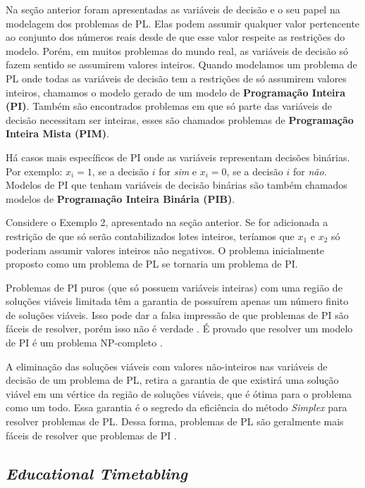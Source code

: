 Na seção anterior foram apresentadas as variáveis de decisão e o seu papel na modelagem dos problemas de PL. Elas podem assumir qualquer valor pertencente ao conjunto dos números reais desde de que esse valor respeite as restrições do modelo. Porém, em muitos problemas do mundo real, as variáveis de decisão só fazem sentido se assumirem valores inteiros. Quando modelamos um problema de PL onde todas as variáveis de decisão tem a restrições de só assumirem valores inteiros, chamamos o modelo gerado de um modelo de \textbf{Programação Inteira (PI)}. Também são encontrados problemas em que só parte das variáveis de decisão necessitam ser inteiras, esses são chamados problemas de \textbf{Programação Inteira Mista (PIM)}. 

Há casos mais específicos de PI onde as variáveis representam decisões binárias. Por exemplo: $x_i = 1$, se a decisão $i$ for \textit{sim} e $x_i = 0$, se a decisão $i$ for \textit{não}. Modelos de PI que tenham variáveis de decisão binárias são também chamados modelos de \textbf{Programação Inteira Binária (PIB)}.

Considere o Exemplo 2, apresentado na seção anterior. Se for adicionada a restrição de que só serão contabilizados lotes inteiros, teríamos que $x_1$ e $x_2$ só poderiam assumir valores inteiros não negativos. O problema inicialmente proposto como um problema de PL se tornaria um problema de PI.

Problemas de PI puros (que só possuem variáveis inteiras) com uma região de soluções viáveis limitada têm a garantia de possuírem apenas um número finito de soluções viáveis. Isso pode dar a falsa impressão de que problemas de PI são fáceis de resolver, porém isso não é verdade \cite{hillier2010introduccao}. É provado que resolver um modelo de PI é um problema NP-completo \cite{schrijver1998theory}.

A eliminação das soluções viáveis com valores não-inteiros nas variáveis de decisão de um problema de PL, retira a garantia de que existirá uma solução viável em um vértice da região de soluções viáveis, que é ótima para o problema como um todo. Essa garantia é o segredo da eficiência do método \textit{Simplex} \cite{schrijver1998theory} para resolver problemas de PL. Dessa forma, problemas de PL são geralmente mais fáceis de resolver que problemas de PI \cite{hillier2010introduccao}.

\subsection{\textit{Educational Timetabling}}


